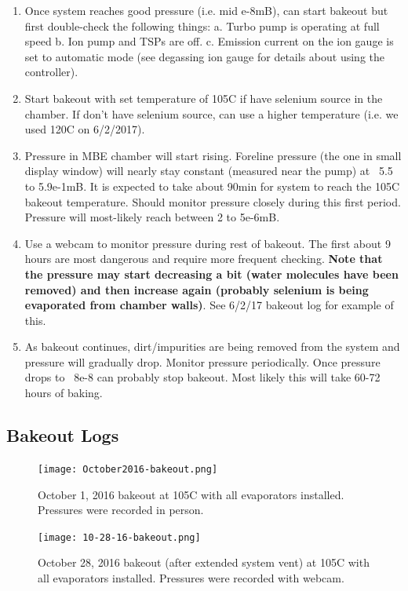 \begin{enumerate}
\item	Once system reaches good pressure (i.e. mid e-8mB), can start bakeout but first double-check the following things:
a.	Turbo pump is operating at full speed
b.	Ion pump and TSPs are off.
c.	Emission current on the ion gauge is set to automatic mode (see degassing ion gauge for details about using the controller).
\item	Start bakeout with set temperature of 105C if have selenium source in the chamber. If don't have selenium source, can use a higher temperature (i.e. we used 120C on 6/2/2017).
\item	Pressure in MBE chamber will start rising. Foreline pressure (the one in small display window) will nearly stay constant (measured near the pump) at ~5.5 to 5.9e-1mB. It is expected to take about 90min for system to reach the 105C bakeout temperature. Should monitor pressure closely during this first period. Pressure will most-likely reach between 2 to 5e-6mB. 
\item Use a webcam to monitor pressure during rest of bakeout. The first about 9 hours are most dangerous and require more frequent checking. \textbf{Note that the pressure may start decreasing a bit (water molecules have been removed) and then increase again (probably selenium is being evaporated from chamber walls)}. See 6/2/17 bakeout log for example of this.
\item	As bakeout continues, dirt/impurities are being removed from the system and pressure will gradually drop. Monitor pressure periodically. Once pressure drops to ~8e-8 can probably stop bakeout. Most likely this will take 60-72 hours of baking.
\end{enumerate}

\subsection{Bakeout Logs}

\begin{figure}[H]
	\centering
	\texttt{[image: October2016-bakeout.png]} 
	\caption{October 1, 2016 bakeout at 105C with all evaporators installed. Pressures were recorded in person.}
	\label{fig:October-bakeout}
\end{figure}

\begin{figure}[H]
	\centering
	\texttt{[image: 10-28-16-bakeout.png]} 
	\caption{October 28, 2016 bakeout (after extended system vent) at 105C with all evaporators installed. Pressures were recorded with webcam.}
	\label{fig:10-28-16-bakeout}
\end{figure}

